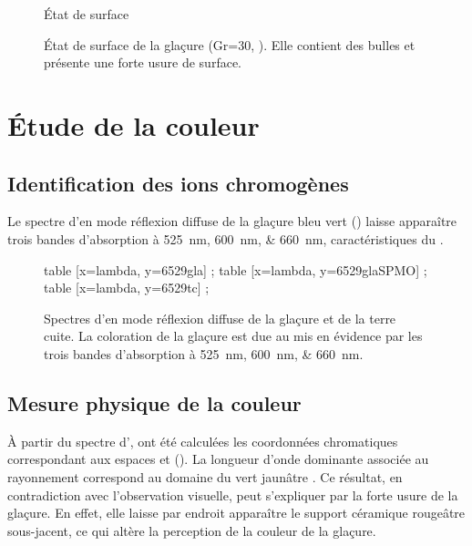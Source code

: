 \begin{figure}[htb]
  État de surface

  \caption{\legendeB 
           État de surface de la glaçure (Gr=\num{30}, 
           ). Elle contient des 
           bulles et présente une forte usure de surface.}
  \label{surf:6529}
\end{figure}


\section{Étude de la couleur}

\subsection{Identification des ions chromogènes}
Le spectre d'\AO en mode réflexion diffuse de la glaçure bleu vert () laisse apparaître trois bandes d'absorption à \SIlist{525;600;660}{\nm}, caractéristiques du  \autocite{Lajarte_1979}.

\begin{figure}[htb]
  \begin{plotspectre}
       table [x=lambda, y=6529gla] {\gladata} ;
       table [x=lambda, y=6529glaSPMO] {\gladata} ;
       table [x=lambda, y=6529tc] {\tcdata} ;
  \end{plotspectre}
  \caption{\legendeB 
           Spectres d'\AO en mode réflexion diffuse de la glaçure et de la terre cuite. La coloration de la glaçure est due au  mis en évidence par les trois bandes d'absorption à \SIlist{525;600;660}{\nm}.}
  \label{spectre:6529}
\end{figure}

\subsection{Mesure physique de la couleur}
À partir du spectre d'\AO, ont été calculées les coordonnées chromatiques correspondant aux espaces \Yxy et \Lab (). La longueur d'onde dominante associée au rayonnement correspond au domaine du vert jaunâtre \autocite{Kelly_1976}. Ce résultat, en contradiction avec l'observation visuelle, peut s'expliquer par la forte usure de la glaçure. En effet, elle laisse par endroit apparaître le support céramique rougeâtre sous-jacent, ce qui altère la perception de la couleur de la glaçure.

